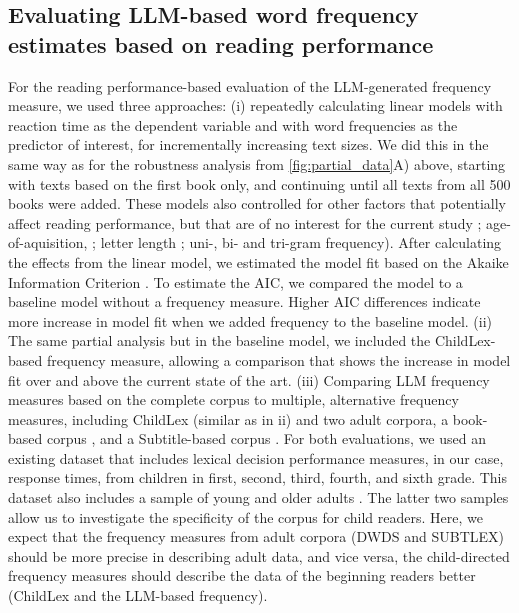 \documentclass[jou, a4paper]{apa7}
\begin{document}
\subsection*{Evaluating LLM-based word frequency estimates based on reading performance}

For the reading performance-based evaluation of the LLM-generated frequency measure, we used three approaches: (i) repeatedly calculating linear models with reaction time as the dependent variable and with word frequencies as the predictor of interest, for incrementally increasing text sizes. We did this in the same way as for the robustness analysis from \ref{fig:partial_data}A) above, starting with texts based on the first book only, and continuing until all texts from all 500 books were added. These models also controlled for other factors that potentially affect reading performance, but that are of no interest for the current study \citep[OLD20, ][]{yarkoni_moving_2008,hawelka_beyond_2013}; age-of-aquisition, \citep{weekes_effects_2006}; letter length \citep{gagl_sources_2015, huestegge_oculomotor_2009, marinus_variability_2010, zoccolotti_word_2005}; uni-, bi- and tri-gram frequency). After calculating the effects from the linear model, we estimated the model fit based on the Akaike Information Criterion \citep[AIC, ][]{akaike_new_1974}. To estimate the AIC, we compared the model to a baseline model without a frequency measure. Higher AIC differences indicate more increase in model fit when we added frequency to the baseline model. (ii) The same partial analysis but in the baseline model, we included the ChildLex-based frequency measure, allowing a comparison that shows the increase in model fit over and above the current state of the art. (iii) Comparing LLM frequency measures based on the complete corpus to multiple, alternative frequency measures, including ChildLex (similar as in ii) and two adult corpora, a book-based corpus \citep[DWDS][]{heister_dlexdb_2011}, and a Subtitle-based corpus \citep[SUBTLEX][]{brysbaert_word_2011}. For both evaluations, we used an existing dataset that includes lexical decision performance measures, in our case, response times, from children in first, second, third, fourth, and sixth grade. This dataset also includes a sample of young and older adults \citep[DeveL, for more details, see ][]{schroter_developmental_2017}. The latter two samples allow us to investigate the specificity of the corpus for child readers. Here, we expect that the frequency measures from adult corpora (DWDS and SUBTLEX) should be more precise in describing adult data, and vice versa, the child-directed frequency measures should describe the data of the beginning readers better (ChildLex and the LLM-based frequency). 
\end{document}
